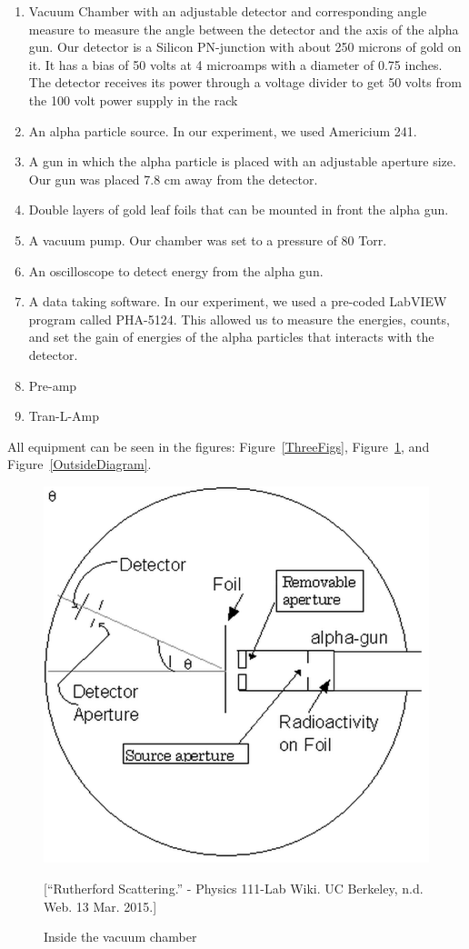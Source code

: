 \begin{enumerate}
\item Vacuum Chamber with an adjustable detector and corresponding angle measure to measure the angle between the detector and the axis of the alpha gun. Our detector is a Silicon PN-junction with about 250 microns of gold on it. It has a bias of 50 volts at 4 microamps with a diameter of 0.75 inches. The detector receives its power through a voltage divider to get 50 volts from the 100 volt power supply in the rack
\item An alpha particle source. In our experiment, we used Americium 241. 
\item A gun in which the alpha particle is placed with an adjustable aperture size. Our gun was placed 7.8 cm away from the detector. 
\item Double layers of gold leaf foils that can be mounted in front the alpha gun.
\item A vacuum pump. Our chamber was set to a pressure of 80 Torr. 
\item An oscilloscope to detect energy from the alpha gun. 
\item A data taking software. In our experiment, we used a pre-coded LabVIEW program called PHA-5124. This allowed us to measure the energies, counts, and set the gain of energies of the alpha particles that interacts with the detector. 
\item Pre-amp
\item Tran-L-Amp
\end{enumerate}

All equipment can be seen in the figures: Figure~\ref{ThreeFigs}, Figure~\ref{Diagram}, and Figure~\ref{OutsideDiagram}.

\begin{figure}[h]
  \includegraphics[width = 3.5 cm]{Diagram.png}
  \begin{center}
  \caption{Inside the vacuum chamber}[\footnotesize{``Rutherford Scattering.'' - Physics 111-Lab Wiki. UC Berkeley, n.d. Web. 13 Mar. 2015.}]
  \label{Diagram}
  \end{center}
\end{figure}

